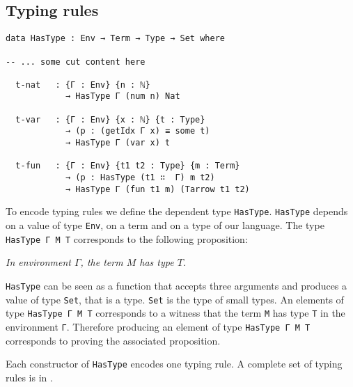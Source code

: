 \documentclass{article}
\begin{document}
\subsection{Typing rules}

\begin{verbatim}
data HasType : Env → Term → Type → Set where

-- ... some cut content here

  t-nat   : {Γ : Env} {n : ℕ}
            → HasType Γ (num n) Nat

  t-var   : {Γ : Env} {x : ℕ} {t : Type}
            → (p : (getIdx Γ x) ≡ some t)
            → HasType Γ (var x) t
            
  t-fun   : {Γ : Env} {t1 t2 : Type} {m : Term}
            → (p : HasType (t1 ∷  Γ) m t2)
            → HasType Γ (fun t1 m) (Tarrow t1 t2)
\end{verbatim}

To encode typing rules we define the dependent type \texttt{HasType}.
\texttt{HasType} depends on a value of type \texttt{Env}, on a term and on a type of our language.
The type \texttt{HasType Γ M T} corresponds to the following proposition:

\vspace{1em}
\textit{In environment $\Gamma$, the term $M$ has type $T$.}
\vspace{1em}

\noindent
\texttt{HasType} can be seen as a function that accepts three arguments and produces a value of type \texttt{Set}, that is a type.
\texttt{Set} is the type of small types.
An elements of type \texttt{HasType Γ M T} corresponds to a witness that the term \texttt{M} has type \texttt{T} in the environment \texttt{Γ}.
Therefore producing an element of type \texttt{HasType Γ M T} corresponds to proving the associated proposition.

Each constructor of \texttt{HasType} encodes one typing rule.
A complete set of typing rules is in \cite[p.\ 15]{crafa}.
\end{document}
